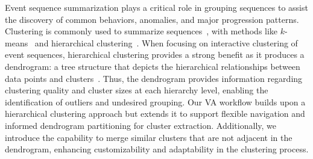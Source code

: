 \documentclass[preprint,journal]{vgtc}            %
\begin{document}
Event sequence summarization plays a critical role in grouping sequences to assist the discovery of common behaviors, anomalies, and major progression patterns. 
Clustering is commonly used to summarize sequences~\cite{Guo22Survey}, with methods like $k$-means~\cite{Forgy65Cluster,Vakali05Overview} and hierarchical clustering~\cite{Berkhin06Survey,Ali19Clustering}.
When focusing on interactive clustering of event sequences, hierarchical clustering provides a strong benefit as it produces a dendrogram: a tree structure that depicts the hierarchical relationships between data points and clusters~\cite{Ran23Comprehensive}.
Thus, the dendrogram provides information regarding clustering quality and cluster sizes at each hierarchy level, enabling the identification of outliers and undesired grouping. 
Our VA workflow builds upon a hierarchical clustering approach but extends it to support flexible navigation and informed dendrogram partitioning for cluster extraction. 
Additionally, we introduce the capability to merge similar clusters that are not adjacent in the dendrogram, enhancing customizability and adaptability in the clustering process. 
\end{document}
